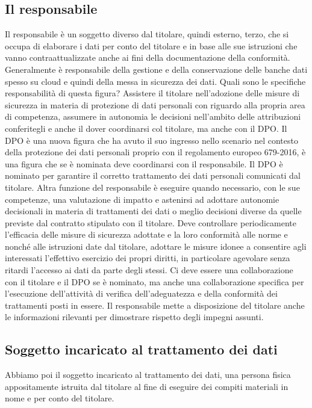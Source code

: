 \subsection{Il responsabile}
Il responsabile è un soggetto diverso dal titolare, quindi esterno, terzo, che si occupa di elaborare i dati per conto del titolare e in base alle sue istruzioni che vanno contraattualizzate anche ai fini della documentazione della conformità.
Generalmente è responsabile della gestione e della conservazione delle banche dati spesso su cloud e quindi della messa in sicurezza dei dati.
Quali sono le specifiche responsabilità di questa figura?
Assistere il titolare nell'adozione delle misure di sicurezza in materia di protezione di dati personali con riguardo alla propria area di competenza, assumere in autonomia le decisioni nell'ambito delle attribuzioni conferitegli e anche il dover coordinarsi col titolare, ma anche con il DPO.
Il DPO è una nuova figura che ha avuto il suo ingresso nello scenario nel contesto della protezione dei dati personali proprio con il regolamento europeo 679-2016, è una figura che se è nominata deve coordinarsi con il responsabile.
Il DPO è nominato per garantire il corretto trattamento dei dati personali comunicati dal titolare.
Altra funzione del responsabile è eseguire quando necessario, con le sue competenze, una valutazione di impatto e astenirsi ad adottare autonomie decisionali in materia di trattamenti dei dati o meglio decisioni diverse da quelle previste dal contratto stipulato con il titolare.
Deve controllare periodicamente l'efficacia delle misure di sicurezza adottate e la loro conformità alle norme e nonché alle istruzioni date dal titolare, adottare le misure idonee a consentire agli interessati l'effettivo esercizio dei propri diritti, in particolare agevolare senza ritardi l'accesso ai dati da parte degli stessi.
Ci deve essere una collaborazione con il titolare e il DPO se è nominato, ma anche una collaborazione specifica per l'esecuzione dell'attività di verifica dell'adeguatezza e della conformità dei trattamenti posti in essere.
Il responsabile mette a disposizione del titolare anche le informazioni rilevanti per dimostrare rispetto degli impegni assunti.

\subsection{Soggetto incaricato al trattamento dei dati}
Abbiamo poi il soggetto incaricato al trattamento dei dati, una persona fisica appositamente istruita dal titolare al fine di eseguire dei compiti materiali in nome e per conto del titolare.

